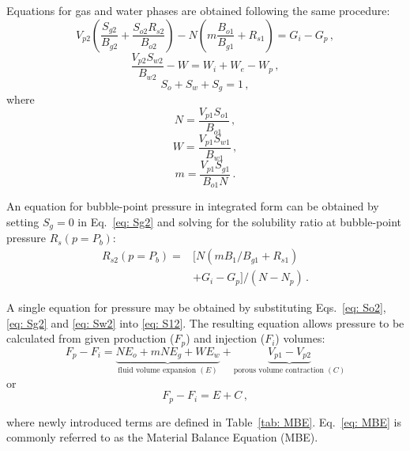 \documentclass[authoryear,preprint,review,12pt]{elsarticle}
\begin{document}
Equations for gas and water phases are obtained following the same procedure:
\begin{equation}\label{eq: Sg5}
V_{p2}\left(\frac{S_{g2}}{B_{g2}} +\frac{S_{o2} R_{s2}}{B_{o2}}\right) - N\left(m\frac{B_{o1}}{B_{g1}} + R_{s1}\right)=G_i-G_p \, ,
\end{equation}
\begin{equation}\label{eq: Sw5}
\frac{V_{p2} S_{w2}}{B_{w2}} - W=W_i+W_e-W_p \, ,
\end{equation}
%
\begin{equation}\label{eq: S15}
S_o+S_w+S_g=1 \, ,
\end{equation}
where
\begin{equation}
N=\frac{V_{p1} S_{o1}}{B_{o1}} \, ,
\end{equation}
\begin{equation}
W=\frac{V_{p1} S_{w1}}{B_{w1}} \, ,
\end{equation}
\begin{equation}
m=\frac{V_{p1} S_{g1}}{B_{o1} N} \, .
\end{equation}

An equation for bubble-point pressure in integrated form can be obtained by setting $S_g=0$ in Eq.~\eqref{eq: Sg2} and solving for the solubility ratio at bubble-point pressure $R_s(p=P_b)$:
\begin{equation}
\begin{split}
R_{s2}\left(p=P_b\right) = &\Big[N\left(m B_{1}/B_{g1} +R_{s1}\right)\\
&+G_i-G_p\Big]/\left(N-N_p\right) \, .
\end{split}
\end{equation}

A single equation for pressure may be obtained by substituting Eqs.~\eqref{eq: So2}, \eqref{eq: Sg2} and \eqref{eq: Sw2} into \eqref{eq: S12}. The resulting equation allows pressure to be calculated from given production ($F_p$) and injection ($F_i$) volumes:
\begin{equation}\label{eq: MBE}
F_p - F_i= \underbrace{N E_o + mN E_g + W E_w}_{\text{fluid volume expansion } (E)} +\underbrace{V_{p1}-V_{p2}}_{\text{porous volume contraction } (C)}
\end{equation}
or
\begin{equation}\label{eq: MBE_short}
F_p - F_i= E + C \, ,
\end{equation}

where newly introduced terms are defined in Table~\ref{tab: MBE}. Eq.~\eqref{eq: MBE} is commonly referred to as the Material Balance Equation (MBE).
\end{document}
